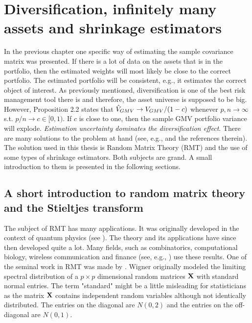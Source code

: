\documentclass[12pt, oneside]{book}\usepackage{knitr}
\begin{document}
{%
\chapter{Diversification, infinitely many assets and shrinkage estimators}\label{ch:highdim}


In the previous chapter one specific way of estimating the sample covariance matrix was presented.
If there is a lot of data on the assets that is in the portfolio, then the estimated weights will most likely be close to the correct portfolio.
The estimated portfolio will be consistent, e.g., it estimates the correct object of interest. 
As previously mentioned, diversification is one of the best risk management tool there is and therefore, the asset universe is supposed to be big.
However, \citet{bodnar2016optimal} Proposition 2.2 states that $\hat{V}_{GMV} \rightarrow V_{GMV}/(1-c)$ whenever $p,n \rightarrow \infty$ s.t. $p/n \rightarrow c \in [0,1)$. 
If $c$ is close to one, then the sample GMV portfolio variance will explode. 
\textit{Estimation uncertainty dominates the diversification effect}. 
There are many solutions to the problem at hand (see, e.g., \citet{lw17} and the references therein). 
The solution used in this thesis is Random Matrix Theory (RMT) and the use of some types of shrinkage estimators. 
Both subjects are grand. 
A small introduction to them is presented in the following sections.

\section{A short introduction to random matrix theory and the Stieltjes transform}
The subject of RMT has many applications. 
It was originally developed in the context of quantum physics (see \citet[Chapter 1 of]{mehta2004random}). 
The theory and its applications have since then developed quite a lot. 
Many fields, such as combinatorics, computational biology, wireless communication and finance (see, e.g., \citet{livan2018introduction}) use these results. 
One of the seminal work in RMT was made by \citet{wigner1967random}. 
Wigner originally modeled the limiting spectral distribution of a $p \times p$ dimensional random matrices $\mathbf{X}$ with standard normal entries.
The term "standard" might be a little misleading for statisticians as the matrix $\mathbf{X}$ contains independent random variables although not identically distributed.
The entries on the diagonal are $N(0,2)$ and the entries on the off-diagonal are $N(0,1)$.

}
\end{document}
